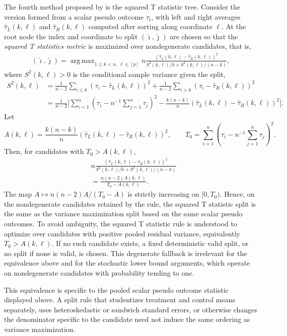 \documentclass[10pt]{article}
\DeclareMathOperator*{\argmax}{arg\,max}
\theoremstyle{definition}
\theoremstyle{remark}
\begin{document}
The fourth method proposed by \cite{Athey-Imbens_2016_PNAS} is the squared T statistic tree. Consider the version formed from a scalar pseudo outcome $\tau_i$, with left and right averages $\hat \tau_L(k,\ell)$ and $\hat \tau_R(k,\ell)$ computed after sorting along coordinate $\ell$. At the root node the index and coordinate to split $(\hat{\imath}, \hat{\jmath})$ are chosen so that the \emph{squared T statistics metric} is maximized over nondegenerate candidates, that is,
\begin{align*}
    (\hat{\imath}, \hat{\jmath}) = \argmax_{1\leq k<n,\ \ell \in [p]} n \frac{(\hat \tau_L(k,\ell) - \hat \tau_R(k, \ell))^2}{S^2(k,\ell)/k + S^2(k,\ell)/(n - k)},
\end{align*}
where $S^2(k,\ell)>0$ is the conditional sample variance given the split,
\begin{align*}
    S^2(k,\ell) & = \frac{1}{n - 2} \sum_{i \leq k} (\tau_i - \hat \tau_L(k,\ell))^2 + \frac{1}{n - 2} \sum_{i > k} (\tau_i - \hat \tau_R(k, \ell))^2 \\
    & = \frac{1}{n - 2} \bigg[\sum_{i = 1}^n (\tau_i - n^{-1}\sum_{j = 1}^n \tau_j)^2 - \frac{k (n - k)}{n} (\hat \tau_L(k,\ell) - \hat \tau_R(k, \ell))^2\bigg].
\end{align*}
Let
\[
    A(k,\ell)=\frac{k(n-k)}{n}(\hat\tau_L(k,\ell)-\hat\tau_R(k,\ell))^2,
    \qquad
    T_0=\sum_{i=1}^n(\tau_i-n^{-1}\sum_{j=1}^n\tau_j)^2.
\]
Then, for candidates with $T_0>A(k,\ell)$,
\begin{align*}
    & n \frac{(\hat \tau_L(k,\ell) - \hat \tau_R(k, \ell))^2}{S^2(k,\ell)/k + S^2(k,\ell)/(n - k)} \\
    & =
    \frac{n(n-2)A(k,\ell)}{T_0-A(k,\ell)}.
\end{align*}
The map $A\mapsto n(n-2)A/(T_0-A)$ is strictly increasing on $[0,T_0)$. Hence, on the nondegenerate candidates retained by the rule, the squared T statistic split is the same as the variance maximization split based on the same scalar pseudo outcomes. To avoid ambiguity, the squared T statistic rule is understood to optimize over candidates with positive pooled residual variance, equivalently $T_0>A(k,\ell)$. If no such candidate exists, a fixed deterministic valid split, or no split if none is valid, is chosen. This degenerate fallback is irrelevant for the equivalence above and for the stochastic lower bound arguments, which operate on nondegenerate candidates with probability tending to one.

This equivalence is specific to the pooled scalar pseudo outcome statistic displayed above. A split rule that studentizes treatment and control means separately, uses heteroskedastic or sandwich standard errors, or otherwise changes the denominator specific to the candidate need not induce the same ordering as variance maximization.
\end{document}
